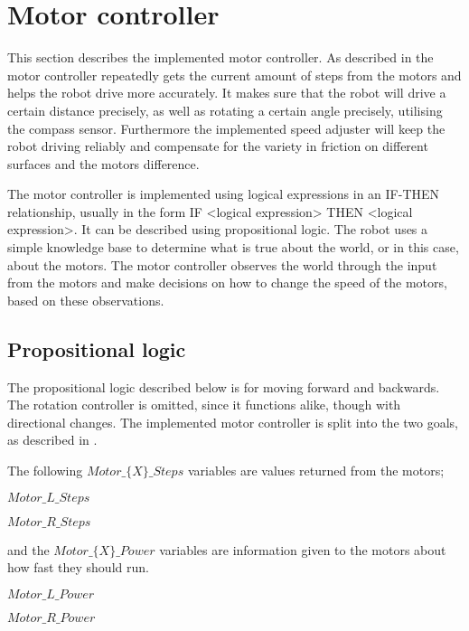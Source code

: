 \section{Motor controller} \label{sec:motor-controller-imp} 
This section describes the implemented motor controller. As described in  the motor controller repeatedly gets the current amount of steps from the motors and helps the robot drive more accurately. It makes sure that the robot will drive a certain distance precisely, as well as rotating a certain angle precisely, utilising the compass sensor. Furthermore the implemented speed adjuster will keep the robot driving reliably and compensate for the variety in friction on different surfaces and the motors difference.

The motor controller is implemented using logical expressions in an IF-THEN relationship, usually in the form IF <logical expression> THEN <logical expression>. It can be described using propositional logic. The robot uses a simple knowledge base to determine what is true about the world, or in this case, about the motors. The motor controller observes the world through the input from the motors and make decisions on how to change the speed of the motors, based on these observations.

\subsection{Propositional logic}

The propositional logic described below is for moving forward and backwards. The rotation controller is omitted, since it functions alike, though with directional changes. The implemented motor controller is split into the two goals, as described in . 

The following $Motor\_\{X\}\_Steps$ variables are values returned from the motors;

\hspace{3mm} $Motor\_L\_Steps$

\hspace{3mm} $Motor\_R\_Steps$

and the $Motor\_\{X\}\_Power$ variables are information given to the motors about how fast they should run.

\hspace{3mm} $Motor\_L\_Power$

\hspace{3mm} $Motor\_R\_Power$

